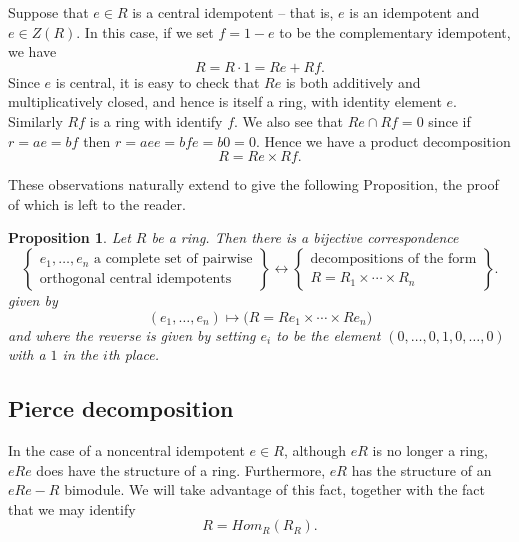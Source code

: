 \documentclass[12pt]{report}
\theoremstyle{plain}
\newtheorem{prop}[thm]{Proposition}
\begin{document}
Suppose that $e \in R$ is a central idempotent -- that is, $e$ is an
idempotent and $e \in Z(R)$. In this case, if we set $f = 1 - e$ to be the
complementary idempotent, we have
\[R = R \cdot 1 = Re + Rf.\]
Since $e$ is central, it is easy to check that $Re$ is both additively and
multiplicatively closed, and hence is itself a ring, with
identity element $e$. Similarly $Rf$ is a ring with identify $f$. We also
see that $Re \cap Rf = 0$ since if $r = ae = bf$ then $r = aee = bfe = b0 =
0$. Hence we have a product decomposition
\[R = Re \times Rf.\]

These observations naturally extend to give the following Proposition, the
proof of which is left to the reader.

\begin{prop} \label{central idempotent decomposition}
Let $R$ be a ring. Then there is a bijective correspondence
\[\left\{
\begin{matrix}
e_1, \ldots, e_n \text{ a complete set of pairwise} \\
\text{orthogonal central idempotents}
\end{matrix}
\right\}
\longleftrightarrow
\left\{
\begin{matrix}
\text{decompositions of the form} \\
R = R_1 \times \cdots \times R_n
\end{matrix}
\right\}.
\]
given by
\[ (e_1, \ldots, e_n) \mapsto \big(R = Re_1 \times \cdots \times Re_n\big)\]
and where the reverse is given by setting $e_i$ to be the element $(0,
\ldots, 0, 1, 0, \ldots, 0)$ with a $1$ in the $i$th place.
\end{prop}

\subsection{Pierce decomposition}

In the case of a noncentral idempotent $e \in R$, although $eR$ is no
longer a ring, $eRe$ does have the structure of a ring. Furthermore, $eR$
has the structure of an $eRe-R$ bimodule. We will take advantage of this
fact, together with the fact that we may identify
\[R = Hom_R(R_R).\]
\end{document}
